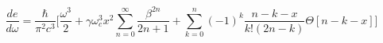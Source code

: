 \begin{equation} \label{rog1}
\frac{de}{d\omega}=\frac{\hbar}{\pi ^{2}c^{3}}\Big[\frac{\omega ^{3}}{2}+
\gamma \omega _{c}^{3}x^{2}\sum _{n=0}^{\infty}\frac{\beta ^{2n}}{2n+1}
+\sum _{k=0}^{n}(-1)^{k}\frac{n-k-x}{k!(2n-k)}\Theta [n-k-x]\Big]
\end{equation}


